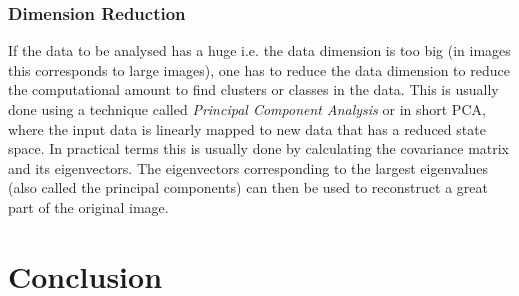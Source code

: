 \subsubsection{Dimension Reduction}
If the data to be analysed has a huge i.e. the data dimension is too big (in images this corresponds to large images), one has to reduce the data dimension to reduce the computational amount to find clusters or classes in the data. This is usually done using a technique called \textit{Principal Component Analysis} or in short PCA, where the input data is linearly mapped to new data that has a reduced state space. In practical terms this is usually done by calculating the covariance matrix and its eigenvectors. The eigenvectors corresponding to the largest eigenvalues (also called the principal components) can then be used to reconstruct a great part of the original image.

\section{Conclusion}

